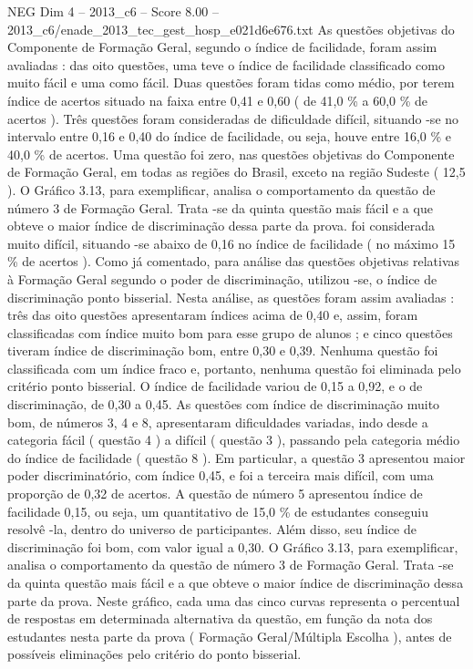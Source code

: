 \begin{textsample}{NEG Dim 4 – 2013\_c6 – Score 8.00 – 2013\_c6/enade\_2013\_tec\_gest\_hosp\_e021d6e676.txt}
As questões objetivas do Componente de Formação Geral, segundo o índice de facilidade, foram assim avaliadas : das oito questões, uma teve o índice de facilidade classificado como muito fácil e uma como fácil.
Duas questões foram tidas como médio, por terem índice de acertos situado na faixa entre 0,41 e 0,60 ( de 41,0 \% a 60,0 \% de acertos ).
Três questões foram consideradas de dificuldade difícil, situando -se no intervalo entre 0,16 e 0,40 do índice de facilidade, ou seja, houve entre 16,0 \% e 40,0 \% de acertos.
Uma questão foi zero, nas questões objetivas do Componente de Formação Geral, em todas as regiões do Brasil, exceto na região Sudeste ( 12,5 ).
O Gráfico 3.13, para exemplificar, analisa o comportamento da questão de número 3 de Formação Geral.
Trata -se da quinta questão mais fácil e a que obteve o maior índice de discriminação dessa parte da prova. foi considerada muito difícil, situando -se abaixo de 0,16 no índice de facilidade ( no máximo 15 \% de acertos ).
Como já comentado, para análise das questões objetivas relativas à Formação Geral segundo o poder de discriminação, utilizou -se, o índice de discriminação ponto bisserial.
Nesta análise, as questões foram assim avaliadas : três das oito questões apresentaram índices acima de 0,40 e, assim, foram classificadas com índice muito bom para esse grupo de alunos ; e cinco questões tiveram índice de discriminação bom, entre 0,30 e 0,39.
Nenhuma questão foi classificada com um índice fraco e, portanto, nenhuma questão foi eliminada pelo critério ponto bisserial.
O índice de facilidade variou de 0,15 a 0,92, e o de discriminação, de 0,30 a 0,45.
As questões com índice de discriminação muito bom, de números 3, 4 e 8, apresentaram dificuldades variadas, indo desde a categoria fácil ( questão 4 ) a difícil ( questão 3 ), passando pela categoria médio do índice de facilidade ( questão 8 ).
Em particular, a questão 3 apresentou maior poder discriminatório, com índice 0,45, e foi a terceira mais difícil, com uma proporção de 0,32 de acertos.
A questão de número 5 apresentou índice de facilidade 0,15, ou seja, um quantitativo de 15,0 \% de estudantes conseguiu resolvê -la, dentro do universo de participantes.
Além disso, seu índice de discriminação foi bom, com valor igual a 0,30.
O Gráfico 3.13, para exemplificar, analisa o comportamento da questão de número 3 de Formação Geral.
Trata -se da quinta questão mais fácil e a que obteve o maior índice de discriminação dessa parte da prova.
Neste gráfico, cada uma das cinco curvas representa o percentual de respostas em determinada alternativa da questão, em função da nota dos estudantes nesta parte da prova ( Formação Geral/Múltipla Escolha ), antes de possíveis eliminações pelo critério do ponto bisserial.

\end{textsample}
